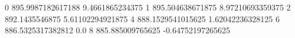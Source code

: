 0 895.9987182617188 9.4661865234375
1 895.504638671875 8.97210693359375
2 892.1435546875 5.61102294921875
4 888.1529541015625 1.62042236328125
6 886.5325317382812 0.0
8 885.885009765625 -0.64752197265625
